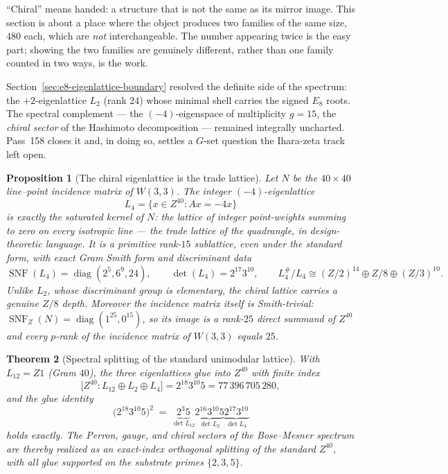\documentclass[12pt,a4paper]{article}
\def\mathbb#1{#1}%
\def\mathbf#1{#1}%
\def\cdot{ }%
\newtheorem{theorem}{Theorem}[section]
\newtheorem{proposition}[theorem]{Proposition}
\theoremstyle{definition}
\begin{document}
\begin{plainbox}
``Chiral'' means handed: a structure that is not the same as its mirror image.
This section is about a place where the object produces two families of the same size,
$480$ each, which are \emph{not} interchangeable. The number appearing twice is the easy
part; showing the two families are genuinely different, rather than one family counted in
two ways, is the work.
\end{plainbox}

\label{sec:chiral-trade-lattice}

Section~\ref{sec:e8-eigenlattice-boundary} resolved the definite side of the
spectrum: the $+2$-eigenlattice $L_2$ (rank $24$) whose minimal shell carries
the signed $E_8$ roots. The spectral complement --- the $(-4)$-eigenspace of
multiplicity $g=15$, the \emph{chiral sector} of the Hashimoto decomposition
--- remained integrally uncharted. Pass~158 closes it and, in doing so,
settles a $G$-set question the Ihara-zeta track left open.

\begin{proposition}[The chiral eigenlattice is the trade lattice]
\label{prop:chiral-trade}
Let $N$ be the $40\times40$ line--point incidence matrix of $W(3,3)$. The
integer $(-4)$-eigenlattice
\[
  L_{4}=\{x\in\mathbb Z^{40}: Ax=-4x\}
\]
is exactly the saturated kernel of $N$: the lattice of integer point-weights
summing to zero on \emph{every} isotropic line --- the \emph{trade lattice}
of the quadrangle, in design-theoretic language. It is a primitive rank-$15$
sublattice, \emph{even} under the standard form, with exact Gram Smith form
and discriminant data
\[
 \operatorname{SNF}(L_4)=\operatorname{diag}(2^{5},6^{9},24),
 \qquad
 \det(L_4)=2^{17}3^{10},
 \qquad
 L_4^{\#}/L_4\cong(\mathbb Z/2)^{14}\oplus\mathbb Z/8\oplus(\mathbb Z/3)^{10}.
\]
Unlike $L_2$, whose discriminant group is elementary, the chiral lattice
carries a genuine $\mathbb Z/8$ depth. Moreover the incidence matrix itself
is \emph{Smith-trivial}: $\operatorname{SNF}_{\mathbb Z}(N)=
\operatorname{diag}(1^{25},0^{15})$, so its image is a rank-$25$ direct
summand of $\mathbb Z^{40}$ and every $p$-rank of the incidence matrix of
$W(3,3)$ equals $25$.
\end{proposition}

\begin{theorem}[Spectral splitting of the standard unimodular lattice]
\label{thm:glue-identity}
With $L_{12}=\mathbb Z\cdot\mathbf 1$ (Gram $40$), the three eigenlattices
glue into $\mathbb Z^{40}$ with finite index
\[
  \bigl[\mathbb Z^{40}:L_{12}\oplus L_2\oplus L_4\bigr]
  = 2^{18}3^{10}5
  = 77\,396\,705\,280,
\]
and the glue identity
\[
  \bigl(2^{18}3^{10}5\bigr)^2
  \;=\;
  \underbrace{2^3\!\cdot\!5}_{\det L_{12}}
  \cdot
  \underbrace{2^{16}3^{10}5}_{\det L_2}
  \cdot
  \underbrace{2^{17}3^{10}}_{\det L_4}
\]
holds exactly. The Perron, gauge, and chiral sectors of the Bose--Mesner
spectrum are thereby realized as an exact-index orthogonal splitting of the
standard $\mathbb Z^{40}$, with all glue supported on the substrate primes
$\{2,3,5\}$.
\end{theorem}
\end{document}
